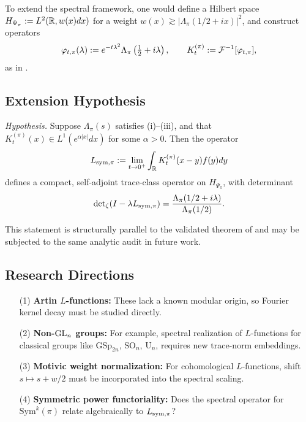 To extend the spectral framework, one would define a Hilbert space \( H_{\Psi_\pi} := L^2(\mathbb{R}, w(x) dx) \) for a weight \( w(x) \gtrsim |\Lambda_\pi(1/2 + i x)|^2 \), and construct operators
\[
\varphi_{t,\pi}(\lambda) := e^{-t\lambda^2} \Lambda_\pi\left( \tfrac{1}{2} + i\lambda \right), \qquad K_t^{(\pi)} := \mathcal{F}^{-1}[\varphi_{t,\pi}],
\]
as in .

\subsection*{Extension Hypothesis}

\textit{Hypothesis.} Suppose \( \Lambda_\pi(s) \) satisfies (i)--(iii), and that \( K_t^{(\pi)}(x) \in L^1(e^{\alpha |x|} dx) \) for some \( \alpha > 0 \). Then the operator
\[
L_{\mathrm{sym},\pi} := \lim_{t \to 0^+} \int_{\mathbb{R}} K_t^{(\pi)}(x - y) f(y) dy
\]
defines a compact, self-adjoint trace-class operator on \( H_{\Psi_\pi} \), with determinant
\[
\det\nolimits_{\zeta}(I - \lambda L_{\mathrm{sym},\pi}) = \frac{\Lambda_\pi(1/2 + i\lambda)}{\Lambda_\pi(1/2)}.
\]

This statement is structurally parallel to the validated theorem of  and may be subjected to the same analytic audit in future work.

\subsection*{Research Directions}

\begin{itemize}
  \item[(1)] \textbf{Artin \( L \)-functions:} These lack a known modular origin, so Fourier kernel decay must be studied directly.
  \item[(2)] \textbf{Non-\( \mathrm{GL}_n \) groups:} For example, spectral realization of \( L \)-functions for classical groups like \( \mathrm{GSp}_{2n} \), \( \mathrm{SO}_n \), \( \mathrm{U}_n \), requires new trace-norm embeddings.
  \item[(3)] \textbf{Motivic weight normalization:} For cohomological \( L \)-functions, shift \( s \mapsto s + w/2 \) must be incorporated into the spectral scaling.
  \item[(4)] \textbf{Symmetric power functoriality:} Does the spectral operator for \( \mathrm{Sym}^k(\pi) \) relate algebraically to \( L_{\mathrm{sym},\pi} \)?
\end{itemize}

